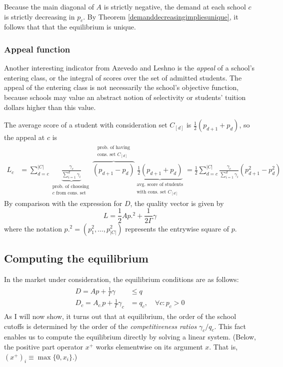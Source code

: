 \documentclass[12pt]{article}
\theoremstyle{definition}
\begin{document}
Because the main diagonal of $A$ is strictly negative, the demand at each school $c$ is strictly decreasing in $p_c$. By Theorem \ref{demanddecreasingimpliesunique}, it follows that that the equilibrium is unique.

\subsubsection{Appeal function}
Another interesting indicator from Azevedo and Leshno \parencite*{supplydemandfw} is the \emph{appeal} of a school's entering class, or the integral of scores over the set of admitted students. The appeal of the entering class is not necessarily the school's objective function, because schools may value an abstract notion of selectivity or students' tuition dollars higher than this value. 

The average score of a student with consideration set $C_{[d]}$ is $\frac{1}{2}\left(p_{d+1} + p_d\right)$, so the appeal at $c$ is
\begin{align}
L_c &= \sum_{d=c}^{|C|} 
\underbrace{\frac{{\gamma_c}}{ \sum_{i=1}^d {\gamma_i}}}_{\substack{\text{prob. of choosing  }\\ c\text{ from cons. set}}} 
\overbrace{\left(p_{d+1} - p_{d}\right)}^{\substack{\text{prob. of having}\\ \text{cons. set }C_{[d]}}} 
\underbrace{\frac{1}{2}\left(p_{d+1} + p_{d}\right)}_{\substack{\text{avg. score of students}\\ \text{with cons. set }C_{[d]}}}
=\frac{1}{2}\sum_{d=c}^{|C|} 
\frac{{\gamma_c}}{ \sum_{i=1}^d {\gamma_i}} 
\left(p_{d+1}^2 -  p_{d}^2\right)
\end{align}
By comparison with the expression for $D$, the quality vector is given by 
\[L = \frac{1}{2} A p.^2 + \frac{1}{2\Gamma} \gamma\]
where the notation $p.^2 = (p_1^2, \dots, p_{|C|}^2)$ represents the entrywise square of $p$.




\subsection{Computing the equilibrium}
In the market under consideration, the equilibrium conditions are as follows:
\begin{gather} \label{ssmnleqconds}
\begin{aligned}
D = A p + \frac{1}{\Gamma}\gamma &\leq q \\
D_c = A_{c.} p + \frac{1}{\Gamma} \gamma_c &= q_c, \quad \forall c: p_c > 0
\end{aligned}
\end{gather}
As I will now show, it turns out that at equilibrium, the order of the school cutoffs is determined by the order of the \emph{competitiveness ratios} $\gamma_c / q_c$. This fact enables us to compute the equilibrium directly by solving a linear system. (Below, the positive part operator $x^+$ works elementwise on its argument $x$. That is, $(x^+)_i \equiv \max\{0, x_i\}$.)
\end{document}
